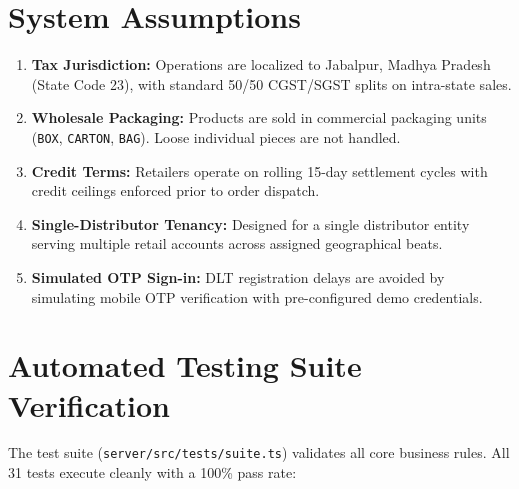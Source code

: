 \documentclass[11pt,a4paper]{article}
\begin{document}
\section{System Assumptions}
\begin{enumerate}[leftmargin=1.5cm]
    \item \textbf{Tax Jurisdiction:} Operations are localized to Jabalpur, Madhya Pradesh (State Code 23), with standard 50/50 CGST/SGST splits on intra-state sales.
    \item \textbf{Wholesale Packaging:} Products are sold in commercial packaging units (\texttt{BOX}, \texttt{CARTON}, \texttt{BAG}). Loose individual pieces are not handled.
    \item \textbf{Credit Terms:} Retailers operate on rolling 15-day settlement cycles with credit ceilings enforced prior to order dispatch.
    \item \textbf{Single-Distributor Tenancy:} Designed for a single distributor entity serving multiple retail accounts across assigned geographical beats.
    \item \textbf{Simulated OTP Sign-in:} DLT registration delays are avoided by simulating mobile OTP verification with pre-configured demo credentials.
\end{enumerate}

\section{Automated Testing Suite Verification}

The test suite (\texttt{server/src/tests/suite.ts}) validates all core business rules. All 31 tests execute cleanly with a 100\% pass rate:
\end{document}
